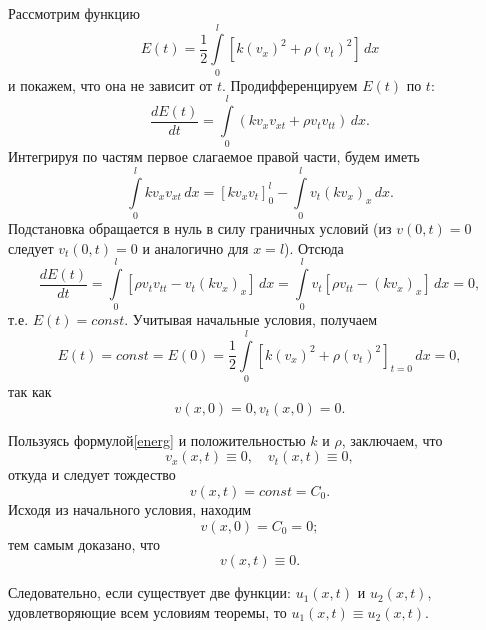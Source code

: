 Рассмотрим функцию 
\begin{equation}
	E(t) = \frac{1}{2} \int \limits_{0}^{l} [k(v_x)^2 + \rho(v_t)^2] \, dx
\end{equation}
и покажем, что она не зависит от $t$. Продифференцируем $E(t)$ по $t$:
\begin{equation*}
	\frac{d E(t)}{dt} = \int \limits_{0}^{l} (k v_x v_{xt} + \rho v_t v_{tt}) \, dx.
\end{equation*}
Интегрируя по частям первое слагаемое правой части, будем иметь
\begin{equation} \label{firstint}
	\int \limits_{0}^{l} k v_x v_{xt} \, dx = [k v_x v_t]_{0}^{l} - \int \limits_{0}^{l} v_t (k v_x)_x \, dx.
\end{equation}
Подстановка обращается в нуль в силу граничных условий (из $v(0, t) = 0$ следует $v_t(0, t) = 0$ и аналогично для $x = l$). Отсюда
\begin{equation*}
	\frac{d E(t)}{dt} = \int \limits_{0}^{l} [\rho v_t v_{tt} - v_t (k v_x)_x] \, dx = \int \limits_{0}^{l} v_{t} [\rho v_{tt} - (k v_{x})_x] \, dx = 0,
\end{equation*}
т.е. $E(t) = const$. Учитывая начальные условия, получаем
\begin{equation} \label{energ}
	E(t) = const = E(0) = \frac{1}{2} \int \limits_{0}^{l} [k(v_x)^2 + \rho (v_t)^2]_{t = 0} \, dx = 0,
\end{equation}
так как 
\begin{equation*}
	v(x, 0) = 0, v_t(x, 0) = 0.
\end{equation*}

Пользуясь формулой\eqref{energ} и положительностью $k$ и $\rho$, заключаем, что 
\begin{equation*}
	v_x(x, t) \equiv 0, \quad v_t(x, t) \equiv 0,
\end{equation*}
откуда и следует тождество
\begin{equation}
	v(x, t) = const = C_0.
\end{equation}
Исходя из начального условия, находим
\begin{equation*}
	v(x, 0) = C_0 = 0;
\end{equation*}
тем самым доказано, что 
\begin{equation}
	v(x, t) \equiv 0.
\end{equation}

Следовательно, если существует две функции: $u_1(x, t)$ и $u_2(x, t)$, удовлетворяющие всем условиям теоремы, то $u_1(x, t) \equiv u_2(x, t)$.

